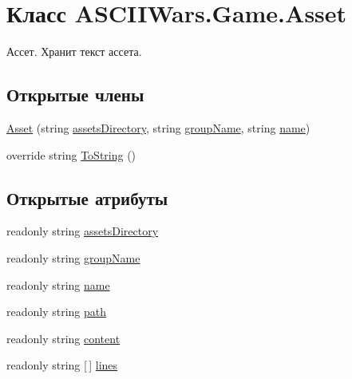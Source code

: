 \hypertarget{class_a_s_c_i_i_wars_1_1_game_1_1_asset}{}\section{Класс A\+S\+C\+I\+I\+Wars.\+Game.\+Asset}
\label{class_a_s_c_i_i_wars_1_1_game_1_1_asset}


Ассет. Хранит текст ассета.  


\subsection*{Открытые члены}
\begin{DoxyCompactItemize}
\item 
\hyperlink{class_a_s_c_i_i_wars_1_1_game_1_1_asset_ab587d66e5e4257ab6baa804b00f2b112}{Asset} (string \hyperlink{class_a_s_c_i_i_wars_1_1_game_1_1_asset_ac77e5c7b34bf76f64cc56e2519e4ef10}{assets\+Directory}, string \hyperlink{class_a_s_c_i_i_wars_1_1_game_1_1_asset_abdde541a3e0a35d1f80de3ceaea7db50}{group\+Name}, string \hyperlink{class_a_s_c_i_i_wars_1_1_game_1_1_asset_a5bd9f716708c7943bdd313357da7d7f3}{name})
\item 
override string \hyperlink{class_a_s_c_i_i_wars_1_1_game_1_1_asset_aaf8fcd0eea1ca1b6a5cd26be7ee8c24c}{To\+String} ()
\end{DoxyCompactItemize}
\subsection*{Открытые атрибуты}
\begin{DoxyCompactItemize}
\item 
readonly string \hyperlink{class_a_s_c_i_i_wars_1_1_game_1_1_asset_ac77e5c7b34bf76f64cc56e2519e4ef10}{assets\+Directory}
\item 
readonly string \hyperlink{class_a_s_c_i_i_wars_1_1_game_1_1_asset_abdde541a3e0a35d1f80de3ceaea7db50}{group\+Name}
\item 
readonly string \hyperlink{class_a_s_c_i_i_wars_1_1_game_1_1_asset_a5bd9f716708c7943bdd313357da7d7f3}{name}
\item 
readonly string \hyperlink{class_a_s_c_i_i_wars_1_1_game_1_1_asset_a2d1d00016592f2930725bf14a2a05fb8}{path}
\item 
readonly string \hyperlink{class_a_s_c_i_i_wars_1_1_game_1_1_asset_a6be81140383341818eaea6ffd8c6c29b}{content}
\item 
readonly string \mbox{[}$\,$\mbox{]} \hyperlink{class_a_s_c_i_i_wars_1_1_game_1_1_asset_ab69cdc626d285fd7e8415f0b7cb25f54}{lines}
\end{DoxyCompactItemize}


